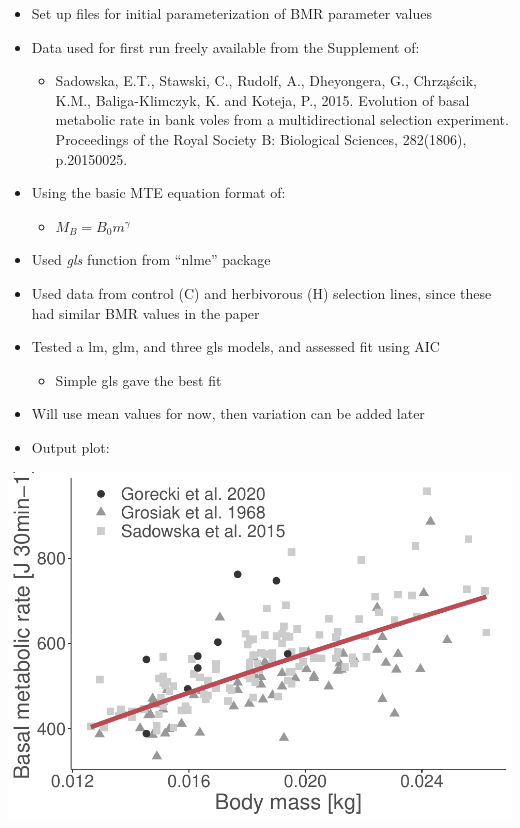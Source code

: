 \documentclass[
]{article}
\providecommand{\tightlist}{%
  \setlength{\itemsep}{0pt}\setlength{\parskip}{0pt}}
\begin{document}
\begin{itemize}
\tightlist
\item
  Set up files for initial parameterization of BMR parameter values\\
\item
  Data used for first run freely available from the Supplement of:

  \begin{itemize}
  \tightlist
  \item
    Sadowska, E.T., Stawski, C., Rudolf, A., Dheyongera, G., Chrząścik,
    K.M., Baliga-Klimczyk, K. and Koteja, P., 2015. Evolution of basal
    metabolic rate in bank voles from a multidirectional selection
    experiment. Proceedings of the Royal Society B: Biological Sciences,
    282(1806), p.20150025.\\
  \end{itemize}
\item
  Using the basic MTE equation format of:

  \begin{itemize}
  \tightlist
  \item
    \(M_B = B_0m^γ\)
  \end{itemize}
\item
  Used \emph{gls} function from ``nlme'' package\\
\item
  Used data from control (C) and herbivorous (H) selection lines, since
  these had similar BMR values in the paper\\
\item
  Tested a lm, glm, and three gls models, and assessed fit using AIC

  \begin{itemize}
  \tightlist
  \item
    Simple gls gave the best fit\\
  \end{itemize}
\item
  Will use mean values for now, then variation can be added later\\
\item
  Output plot:
\end{itemize}

\includegraphics{EBIVnotebook_files/figure-latex/unnamed-chunk-1-1.pdf}
\end{document}

